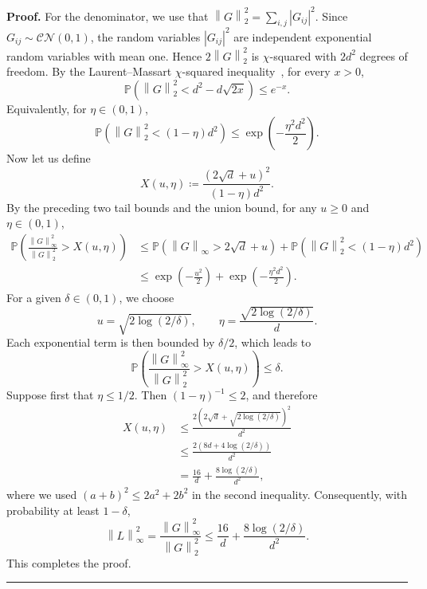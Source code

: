 \documentclass[superscriptaddress,amsmath,amssymb,aps,pra,letterpaper,tightenlines,notitlepages,12pt]{revtex4-2}
\newenvironment{proof}[1][Proof]{\noindent\textbf{#1.} }{\ \rule{0.5em}{0.5em}}
\begin{document}
\begin{proof}
    For the denominator, we use that $\left\|G\right\|_2^2=\sum_{i,j}|G_{ij}|^2$. Since $G_{ij}\sim\mathcal{CN}(0,1)$, the random variables $|G_{ij}|^2$ are independent exponential random variables with mean one. Hence $2\left\|G\right\|_2^2$ is $\chi$-squared with $2d^2$ degrees of freedom. By the Laurent--Massart $\chi$-squared inequality~\cite[Lemma~1, Eq.~(4.4)]{laurent2000AdaptiveEstimationQuadratic}, for every $x>0$,
    \begin{equation}
        \mathbb{P}\!\left(\left\|G\right\|_2^2 < d^2-d\sqrt{2x}\right)\le e^{-x}.
    \end{equation}
    Equivalently, for $\eta\in(0,1)$,
    \begin{equation}
        \mathbb{P}\!\left(\left\|G\right\|_2^2 < (1-\eta)d^2\right)\le \exp\!\left(-\frac{\eta^2d^2}{2}\right).
    \end{equation}
    Now let us define
    \begin{equation}
        X(u,\eta)\coloneqq\frac{(2\sqrt d+u)^2}{(1-\eta)d^2}.
    \end{equation}
    By the preceding two tail bounds and the union bound, for any $u\ge0$ and $\eta\in(0,1)$,
    \begin{align}
        \mathbb{P}\!\left(\frac{\left\|G\right\|_\infty^2}{\left\|G\right\|_2^2} > X(u,\eta)\right)
        &\leq \mathbb{P}\!\left(\left\|G\right\|_\infty > 2\sqrt d+u\right) 
            +\mathbb{P}\!\left(\left\|G\right\|_2^2 < (1-\eta)d^2\right)\nonumber\\
        &\le \exp\!\left(-\frac{u^2}{2}\right)+\exp\!\left(-\frac{\eta^2 d^2}{2}\right).
    \end{align}
    For a given $\delta\in(0,1)$, we choose
    \begin{equation}
        u = \sqrt{2\log(2/\delta)}, \qquad
        \eta = \frac{\sqrt{2\log(2/\delta)}}{d}.
    \end{equation}
    Each exponential term is then bounded by $\delta/2$, which leads to 
    \begin{equation}
        \mathbb{P}\!\left(\frac{\left\|G\right\|_\infty^2}{\left\|G\right\|_2^2} > X(u,\eta)\right) \le \delta.
    \end{equation}
    Suppose first that $\eta\le 1/2$. 
    Then $(1-\eta)^{-1}\le2$, and therefore
    \begin{align}    
        X(u,\eta) &\le \frac{2\left(2\sqrt d+\sqrt{2\log(2/\delta)}\right)^2}{d^2}\\
        &\le \frac{2\left(8d+4\log(2/\delta)\right)}{d^2}\\
        &= \frac{16}{d}+ \frac{8\log(2/\delta)}{d^2},
    \end{align}
    where we used $(a+b)^2\le 2a^2+2b^2$ in the second inequality.
    Consequently, with probability at least $1-\delta$,
    \begin{equation}
        \left\|L\right\|_\infty^2 = \frac{\left\|G\right\|_\infty^2}{\left\|G\right\|_2^2}
        \le \frac{16}{d} + \frac{8\log(2/\delta)}{d^2}.
    \end{equation}
    This completes the proof.
\end{proof}
\end{document}
